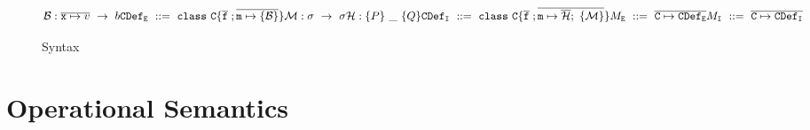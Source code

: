 \documentclass[12pt]{article}
\begin{document}
\begin{figure}[h]
\[\mathcal{B} : \overline{\texttt{x} \mapsto v}\ \rightarrow\ b \\
\texttt{CDef}_\texttt{E}\ ::=\ \texttt{class}\ \texttt{C} \{ 
	\overline{\texttt{f}}\; ; 
	\overline{\texttt{m} \mapsto \{ \mathcal{B}\}}
\}\\
\mathcal{M} : \sigma\ \rightarrow\ \sigma \\
\mathcal{H} : \{P\}\ \_\ \{Q\}  \\
\texttt{CDef}_\texttt{I}\ ::=\ \texttt{class}\ \texttt{C} \{ 
	\overline{\texttt{f}}\; ; 
	\overline{\texttt{m} \mapsto \overline{\mathcal{H}};\ \{\mathcal{M}\}}
\}\\
M_{\texttt{E}}\ ::=\ \overline{\texttt{C} \mapsto \texttt{CDef}_\texttt{E}}\\
M_{\texttt{I}}\ ::=\ \overline{\texttt{C} \mapsto \texttt{CDef}_\texttt{I}}
\]
\caption{Syntax}
\label{f:syntax}
\end{figure}


\section{Operational Semantics}
\end{document}
